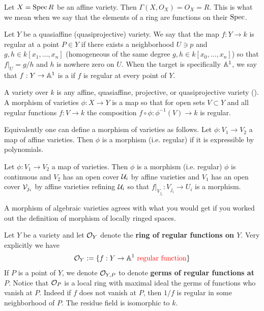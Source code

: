 \documentclass[12pt]{article}
\begin{document}
\begin{remark}
Let $X = \operatorname{Spec} R$ be an affine variety. Then $\Gamma(X,O_X) = O_X = R$. This is what we mean when we say that the elements of a ring are functions on their $\operatorname{Spec}$. 
\end{remark}

\begin{definition}
Let $Y$ be a quasiaffine (quasiprojective) variety. We say that the map $f:Y\to k$ is regular at a point $P\in Y$ if there exists a neighborhood $U\ni p$ and $g,h\in k[x_1,\dots,x_n]$ (homogeneous of the same degree $g,h\in k[x_0,\dots,x_n]$) so that $f\vert_U = g/h$ and $h$ is nowhere zero on $U$. When the target is specifically $\mathbb{A}^1$, we say that $f:Y\to\mathbb{A}^1$ is a  if $f$ is regular at every point of $Y$.
\end{definition}
\begin{definition}
A variety over $k$ is any affine, quasiaffine, projective, or quasiprojective variety (). A morphism of varieties $\phi:X\to Y$ is a map so that for open sets $V\subset Y$ and all regular functions $f:V\to k$ the composition $f\circ\phi:\phi^{-1}(V) \to k$ is regular. 
\end{definition}

\begin{proposition}
Equivalently one can define a morphism of varieties as follows. Let $\phi:V_1\to V_2$ a map of affine varieties. Then $\phi$ is a morphism (i.e. regular) if it is expressible by polynomials.

Let $\phi:V_1\to V_2$ a map of varieties. Then $\phi$ is a morphism (i.e. regular) $\phi$ is continuous and $V_2$ has an open cover $\mathcal{U}_i$ by affine varieties and $V_1$ has an open cover $\mathcal{V}_{j_i}$ by affine varieties refining $\mathcal{U}_i$ so that $f\vert_{V_{j_i}}:V_{j_i}\to U_i$ is a morphism.
\end{proposition}

\begin{remark}
A morphism of algebraic varieties agrees with what you would get if you worked out the definition of morphism of locally ringed spaces.
\end{remark}

\begin{definition}
Let $Y$ be a variety and let $\mathcal{O}_Y$ denote the \textbf{ring of regular functions on $Y$}. Very explicitly we have \begin{align*}
    \mathcal{O}_Y := \{f:Y\to\mathbb{A}^1 \text{\textcolor{red}{{ regular function}}}\}
\end{align*}If $P$ is a point of $Y$, we denote $\mathcal{O}_{Y,P}$ to denote \textbf{germs of regular functions at $P$}. Notice that $\mathcal{O}_P$ is a local ring with maximal ideal the germs of functions who vanish at $P$. Indeed if $f$ does not vanish at $P$, then $1/f$ is regular in some neighborhood of $P$. The residue field is isomorphic to $k$.
\end{definition}
\end{document}
